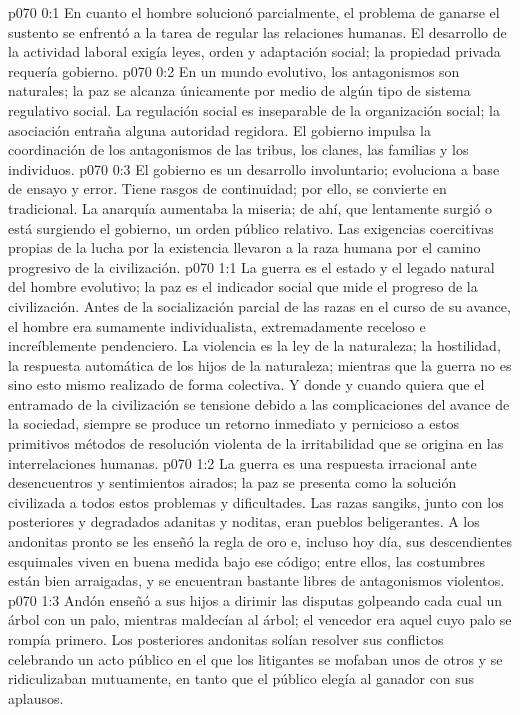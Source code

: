 \author{Melquisedec}
\vs p070 0:1 En cuanto el hombre solucionó parcialmente, el problema de ganarse el sustento se enfrentó a la tarea de regular las relaciones humanas. El desarrollo de la actividad laboral exigía leyes, orden y adaptación social; la propiedad privada requería gobierno.
\vs p070 0:2 En un mundo evolutivo, los antagonismos son naturales; la paz se alcanza únicamente por medio de algún tipo de sistema regulativo social. La regulación social es inseparable de la organización social; la asociación entraña alguna autoridad regidora. El gobierno impulsa la coordinación de los antagonismos de las tribus, los clanes, las familias y los individuos.
\vs p070 0:3 El gobierno es un desarrollo involuntario; evoluciona a base de ensayo y error. Tiene rasgos de continuidad; por ello, se convierte en tradicional. La anarquía aumentaba la miseria; de ahí, que lentamente surgió o está surgiendo el gobierno, un orden público relativo. Las exigencias coercitivas propias de la lucha por la existencia llevaron a la raza humana por el camino progresivo de la civilización.
\vs p070 1:1 La guerra es el estado y el legado natural del hombre evolutivo; la paz es el indicador social que mide el progreso de la civilización. Antes de la socialización parcial de las razas en el curso de su avance, el hombre era sumamente individualista, extremadamente receloso e increíblemente pendenciero. La violencia es la ley de la naturaleza; la hostilidad, la respuesta automática de los hijos de la naturaleza; mientras que la guerra no es sino esto mismo realizado de forma colectiva. Y donde y cuando quiera que el entramado de la civilización se tensione debido a las complicaciones del avance de la sociedad, siempre se produce un retorno inmediato y pernicioso a estos primitivos métodos de resolución violenta de la irritabilidad que se origina en las interrelaciones humanas.
\vs p070 1:2 La guerra es una respuesta irracional ante desencuentros y sentimientos airados; la paz se presenta como la solución civilizada a todos estos problemas y dificultades. Las razas sangiks, junto con los posteriores y degradados adanitas y noditas, eran pueblos beligerantes. A los andonitas pronto se les enseñó la regla de oro e, incluso hoy día, sus descendientes esquimales viven en buena medida bajo ese código; entre ellos, las costumbres están bien arraigadas, y se encuentran bastante libres de antagonismos violentos.
\vs p070 1:3 Andón enseñó a sus hijos a dirimir las disputas golpeando cada cual un árbol con un palo, mientras maldecían al árbol; el vencedor era aquel cuyo palo se rompía primero. Los posteriores andonitas solían resolver sus conflictos celebrando un acto público en el que los litigantes se mofaban unos de otros y se ridiculizaban mutuamente, en tanto que el público elegía al ganador con sus aplausos.
